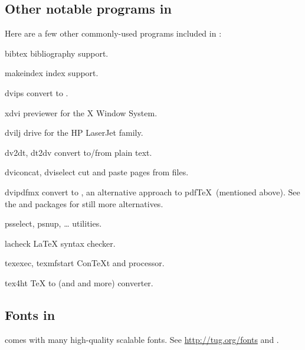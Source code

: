 \documentclass{article}
\begin{document}
\subsection{Other notable programs in \protect\TL}

Here are a few other commonly-used programs included in \TL{}:

\begin{cmddescription}

\item [bibtex] bibliography support.

\item [makeindex] index support.

\item [dvips] convert \dvi{} to \PS{}.

\item [xdvi] \dvi{} previewer for the X Window System.

\item [dvilj] \dvi{} drive for the HP LaserJet family.

\item [dv2dt, dt2dv] convert \dvi{} to/from plain text.

\item [dviconcat, dviselect] cut and paste pages
from \dvi{} files.

\item [dvipdfmx] convert \dvi{} to , an alternative approach
to pdf\TeX\ (mentioned above).  See the  and
 packages for still more alternatives.

\item [psselect, psnup, \ldots] \PS{}
utilities.

\item [lacheck] \LaTeX{} syntax checker.

\item [texexec, texmfstart] Con\TeX{}t and  processor.

\item [tex4ht] \TeX{} to  (and  and more) converter.

\end{cmddescription}


\subsection{Fonts in \protect\TL}
\label{sec:tl-fonts}

\TL{} comes with many high-quality scalable fonts.  See
\url{http://tug.org/fonts} and 
.
\end{document}
